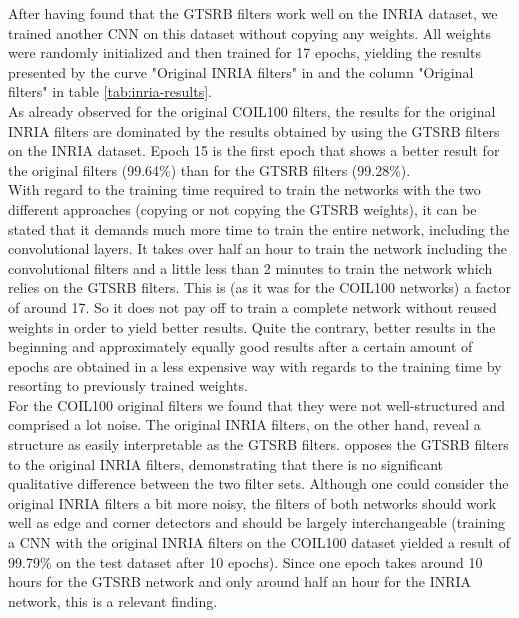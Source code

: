 \documentclass[11pt, a4paper]{article}
\begin{document}
After having found that the GTSRB filters work well on the INRIA dataset, we trained another CNN on this dataset without copying any weights. All weights were randomly initialized and then trained for 17 epochs, yielding the results presented by the curve "Original INRIA filters" in  and the column "Original filters" in table \ref{tab:inria-results}.\\
As already observed for the original COIL100 filters, the results for the original INRIA filters are dominated by the results obtained by using the GTSRB filters on the INRIA dataset. Epoch 15 is the first epoch that shows a better result for the original filters (99.64\%) than for the GTSRB filters (99.28\%).\\
With regard to the training time required to train the networks with the two different approaches (copying or not copying the GTSRB weights), it can be stated that it demands much more time to train the entire network, including the convolutional layers. It takes over half an hour to train the network including the convolutional filters and a little less than 2 minutes to train the network which relies on the GTSRB filters. This is (as it was for the COIL100 networks) a factor of around 17. So it does not pay off to train a complete network without reused weights in order to yield better results. Quite the contrary, better results in the beginning and approximately equally good results after a certain amount of epochs are obtained in a less expensive way with regards to the training time by resorting to previously trained weights.\\
For the COIL100 original filters we found that they were not well-structured and comprised a lot noise. The original INRIA filters, on the other hand, reveal a structure as easily interpretable as the GTSRB filters.  opposes the GTSRB filters to the original INRIA filters, demonstrating that there is no significant qualitative difference between the two filter sets. Although one could consider the original INRIA filters a bit more noisy, the filters of both networks should work well as edge and corner detectors and should be largely interchangeable (training a CNN with the original INRIA filters on the COIL100 dataset yielded a result of 99.79\% on the test dataset after 10 epochs). Since one epoch takes around 10 hours for the GTSRB network and only around half an hour for the INRIA network, this is a relevant finding.
\end{document}
